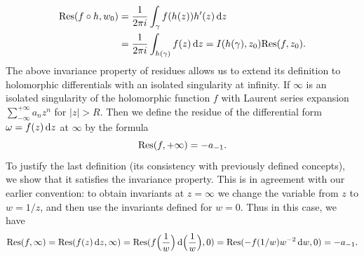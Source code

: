 \begin{align*}
\mathrm{Res}(f\circ h,w_0)&=\frac{1}{2\pi i}\int_{\gamma}f(h(z))h'(z)\mathop{}\!\mathrm{d} z\\
&=\frac{1}{2\pi i}\int_{h(\gamma)}f(z)\mathop{}\!\mathrm{d} z=I(h(\gamma),z_0)\mathrm{Res}(f,z_0).
\end{align*}
The above invariance property of residues allows us to extend its definition to holomorphic differentials with an isolated singularity at infinity. If $\infty$ is an isolated singularity of the holomorphic function $f$ with Laurent series expansion $\sum_{-\infty}^{+\infty}a_nz^n$ for $|z|>R$. Then we define the residue of the differential form $\omega=f(z)\mathop{}\!\mathrm{d} z$ at $\infty$ by the formula
\[\mathrm{Res}(f,+\infty)=-a_{-1}.\]
To justify the last definition (its consistency with previously defined concepts), we show that it satisfies the invariance property. This is in agreement with our earlier convention: to obtain invariants at $z=\infty$ we change the variable from $z$ to $w=1/z$, and then use the invariants defined for $w=0$. Thus in this case, we have
\begin{align*}
\mathrm{Res}(f,\infty)=\mathrm{Res}(f(z)\mathop{}\!\mathrm{d} z,\infty)=\mathrm{Res}(f\Big(\frac{1}{w}\Big)\mathop{}\!\mathrm{d}\Big(\frac{1}{w}\Big),0)=\mathrm{Res}(-f(1/w)w^{-2}\mathop{}\!\mathrm{d} w,0)=-a_{-1}.
\end{align*}
